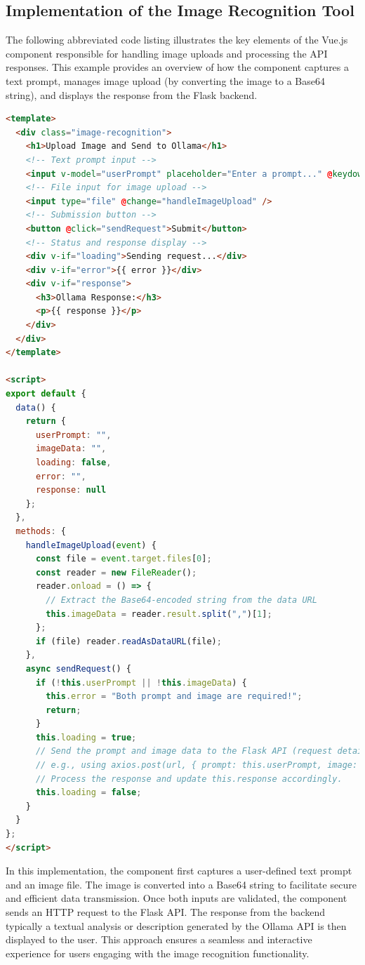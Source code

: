 \subsection{Implementation of the Image Recognition Tool}

The following abbreviated code listing illustrates the key elements of the Vue.js component responsible for handling image uploads and processing the API responses. This example provides an overview of how the component captures a text prompt, manages image upload (by converting the image to a Base64 string), and displays the response from the Flask backend.

\begin{lstlisting}[language=html, caption={Abbreviated Vue.js Component for Image Recognition}, frame=single]
<template>
  <div class="image-recognition">
    <h1>Upload Image and Send to Ollama</h1>
    <!-- Text prompt input -->
    <input v-model="userPrompt" placeholder="Enter a prompt..." @keydown.enter="sendRequest" />
    <!-- File input for image upload -->
    <input type="file" @change="handleImageUpload" />
    <!-- Submission button -->
    <button @click="sendRequest">Submit</button>
    <!-- Status and response display -->
    <div v-if="loading">Sending request...</div>
    <div v-if="error">{{ error }}</div>
    <div v-if="response">
      <h3>Ollama Response:</h3>
      <p>{{ response }}</p>
    </div>
  </div>
</template>

<script>
export default {
  data() {
    return {
      userPrompt: "",
      imageData: "",
      loading: false,
      error: "",
      response: null
    };
  },
  methods: {
    handleImageUpload(event) {
      const file = event.target.files[0];
      const reader = new FileReader();
      reader.onload = () => { 
        // Extract the Base64-encoded string from the data URL
        this.imageData = reader.result.split(",")[1];
      };
      if (file) reader.readAsDataURL(file);
    },
    async sendRequest() {
      if (!this.userPrompt || !this.imageData) {
        this.error = "Both prompt and image are required!";
        return;
      }
      this.loading = true;
      // Send the prompt and image data to the Flask API (request details omitted)
      // e.g., using axios.post(url, { prompt: this.userPrompt, image: this.imageData })
      // Process the response and update this.response accordingly.
      this.loading = false;
    }
  }
};
</script>
\end{lstlisting}

In this implementation, the component first captures a user-defined text prompt and an image file. 
The image is converted into a Base64 string to facilitate secure and efficient data transmission. Once both inputs are validated, 
the component sends an HTTP request to the Flask API. The response from the backend typically a textual analysis or description generated by the Ollama API is then displayed to the user. This approach ensures a seamless and interactive experience for users engaging with the image recognition functionality.


